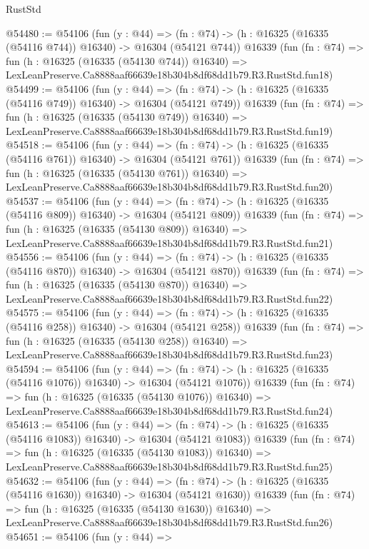 \begin{lexlean}{RustStd}
\begin{coremodule}
@54480 := @54106
    (fun (y : @44) =>
    (fn : @74) -> (h : @16325 (@16335 (@54116 @744)) @16340) -> @16304 (@54121 @744))
    @16339
    (fun (fn : @74) =>
    fun (h : @16325 (@16335 (@54130 @744)) @16340) =>
    LexLeanPreserve.Ca8888aaf66639e18b304b8df68dd1b79.R3.RustStd.fun18)
@54499 := @54106
    (fun (y : @44) =>
    (fn : @74) -> (h : @16325 (@16335 (@54116 @749)) @16340) -> @16304 (@54121 @749))
    @16339
    (fun (fn : @74) =>
    fun (h : @16325 (@16335 (@54130 @749)) @16340) =>
    LexLeanPreserve.Ca8888aaf66639e18b304b8df68dd1b79.R3.RustStd.fun19)
@54518 := @54106
    (fun (y : @44) =>
    (fn : @74) -> (h : @16325 (@16335 (@54116 @761)) @16340) -> @16304 (@54121 @761))
    @16339
    (fun (fn : @74) =>
    fun (h : @16325 (@16335 (@54130 @761)) @16340) =>
    LexLeanPreserve.Ca8888aaf66639e18b304b8df68dd1b79.R3.RustStd.fun20)
@54537 := @54106
    (fun (y : @44) =>
    (fn : @74) -> (h : @16325 (@16335 (@54116 @809)) @16340) -> @16304 (@54121 @809))
    @16339
    (fun (fn : @74) =>
    fun (h : @16325 (@16335 (@54130 @809)) @16340) =>
    LexLeanPreserve.Ca8888aaf66639e18b304b8df68dd1b79.R3.RustStd.fun21)
@54556 := @54106
    (fun (y : @44) =>
    (fn : @74) -> (h : @16325 (@16335 (@54116 @870)) @16340) -> @16304 (@54121 @870))
    @16339
    (fun (fn : @74) =>
    fun (h : @16325 (@16335 (@54130 @870)) @16340) =>
    LexLeanPreserve.Ca8888aaf66639e18b304b8df68dd1b79.R3.RustStd.fun22)
@54575 := @54106
    (fun (y : @44) =>
    (fn : @74) -> (h : @16325 (@16335 (@54116 @258)) @16340) -> @16304 (@54121 @258))
    @16339
    (fun (fn : @74) =>
    fun (h : @16325 (@16335 (@54130 @258)) @16340) =>
    LexLeanPreserve.Ca8888aaf66639e18b304b8df68dd1b79.R3.RustStd.fun23)
@54594 := @54106
    (fun (y : @44) =>
    (fn : @74) -> (h : @16325 (@16335 (@54116 @1076)) @16340) -> @16304 (@54121 @1076))
    @16339
    (fun (fn : @74) =>
    fun (h : @16325 (@16335 (@54130 @1076)) @16340) =>
    LexLeanPreserve.Ca8888aaf66639e18b304b8df68dd1b79.R3.RustStd.fun24)
@54613 := @54106
    (fun (y : @44) =>
    (fn : @74) -> (h : @16325 (@16335 (@54116 @1083)) @16340) -> @16304 (@54121 @1083))
    @16339
    (fun (fn : @74) =>
    fun (h : @16325 (@16335 (@54130 @1083)) @16340) =>
    LexLeanPreserve.Ca8888aaf66639e18b304b8df68dd1b79.R3.RustStd.fun25)
@54632 := @54106
    (fun (y : @44) =>
    (fn : @74) -> (h : @16325 (@16335 (@54116 @1630)) @16340) -> @16304 (@54121 @1630))
    @16339
    (fun (fn : @74) =>
    fun (h : @16325 (@16335 (@54130 @1630)) @16340) =>
    LexLeanPreserve.Ca8888aaf66639e18b304b8df68dd1b79.R3.RustStd.fun26)
@54651 := @54106
    (fun (y : @44) =>

\end{coremodule}
\end{lexlean}
